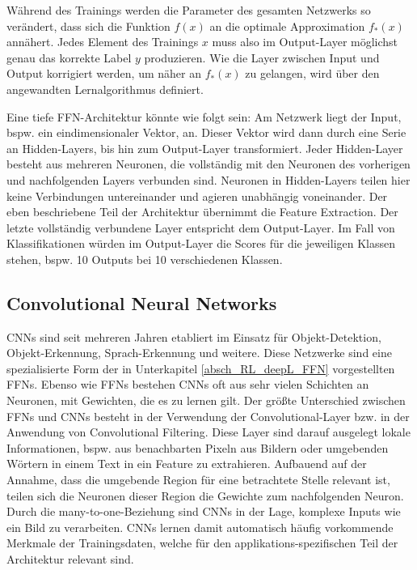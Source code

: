 Während des Trainings werden die Parameter des gesamten Netzwerks so verändert, dass sich die Funktion $f(x)$ an die optimale Approximation $f_*(x)$ annähert. Jedes Element des Trainings $x$ muss also im Output-Layer möglichst genau das korrekte Label $y$ produzieren. Wie die Layer zwischen Input und Output korrigiert werden, um näher an $f_*(x)$ zu gelangen, wird über den angewandten Lernalgorithmus definiert.

Eine tiefe FFN-Architektur könnte wie folgt sein: Am Netzwerk liegt der Input, bspw. ein eindimensionaler Vektor, an. Dieser Vektor wird dann durch eine Serie an Hidden-Layers, bis hin zum Output-Layer transformiert. Jeder Hidden-Layer besteht aus mehreren Neuronen, die vollständig mit den Neuronen des vorherigen und nachfolgenden Layers verbunden sind. Neuronen in Hidden-Layers teilen hier keine Verbindungen untereinander und agieren unabhängig voneinander. Der eben beschriebene Teil der Architektur übernimmt die Feature Extraction. Der letzte vollständig verbundene Layer entspricht dem Output-Layer. Im Fall von Klassifikationen würden im Output-Layer die Scores für die jeweiligen Klassen stehen, bspw. 10 Outputs bei 10 verschiedenen Klassen. 



\subsection{Convolutional Neural Networks}\label{absch_RL_convNets}
CNNs sind seit mehreren Jahren etabliert im Einsatz für Objekt-Detektion, Objekt-Erkennung, Sprach-Erkennung und weitere. Diese Netzwerke sind eine spezialisierte Form der in Unterkapitel \ref{absch_RL_deepL_FFN} vorgestellten FFNs. Ebenso wie FFNs bestehen CNNs oft aus sehr vielen Schichten an Neuronen, mit Gewichten, die es zu lernen gilt. Der größte Unterschied zwischen FFNs und CNNs besteht in der Verwendung der Convolutional-Layer bzw. in der Anwendung von Convolutional Filtering. Diese Layer sind darauf ausgelegt lokale Informationen, bspw. aus benachbarten Pixeln aus Bildern oder umgebenden Wörtern in einem Text in ein Feature zu extrahieren. Aufbauend auf der Annahme, dass die umgebende Region für eine betrachtete Stelle relevant ist, teilen sich die Neuronen dieser Region die Gewichte zum nachfolgenden Neuron. Durch die many-to-one-Beziehung sind CNNs in der Lage, komplexe Inputs wie ein Bild zu verarbeiten. CNNs lernen damit automatisch häufig vorkommende Merkmale der Trainingsdaten, welche für den applikations-spezifischen Teil der Architektur relevant sind. 
 
